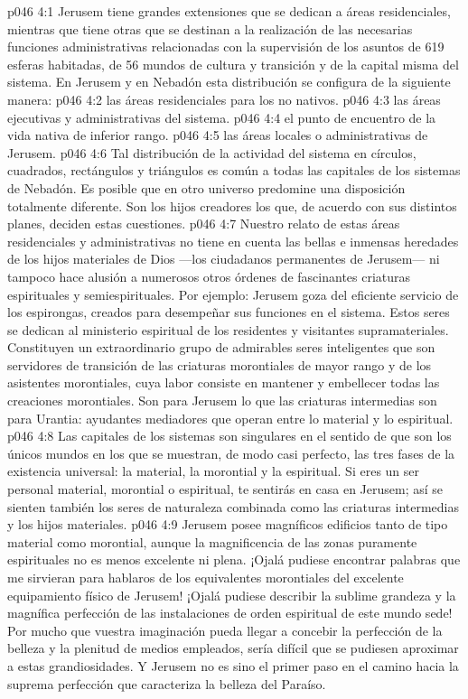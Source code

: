 \vs p046 4:1 Jerusem tiene grandes extensiones que se dedican a áreas residenciales, mientras que tiene otras que se destinan a la realización de las necesarias funciones administrativas relacionadas con la supervisión de los asuntos de 619 esferas habitadas, de 56 mundos de cultura y transición y de la capital misma del sistema. En Jerusem y en Nebadón esta distribución se configura de la siguiente manera:
\vs p046 4:2  las áreas residenciales para los no nativos.
\vs p046 4:3  las áreas ejecutivas y administrativas del sistema.
\vs p046 4:4  el punto de encuentro de la vida nativa de inferior rango.
\vs p046 4:5  las áreas locales o administrativas de Jerusem.
\vs p046 4:6 \pc Tal distribución de la actividad del sistema en círculos, cuadrados, rectángulos y triángulos es común a todas las capitales de los sistemas de Nebadón. Es posible que en otro universo predomine una disposición totalmente diferente. Son los hijos creadores los que, de acuerdo con sus distintos planes, deciden estas cuestiones.
\vs p046 4:7 \pc Nuestro relato de estas áreas residenciales y administrativas no tiene en cuenta las bellas e inmensas heredades de los hijos materiales de Dios ---los ciudadanos permanentes de Jerusem--- ni tampoco hace alusión a numerosos otros órdenes de fascinantes criaturas espirituales y semiespirituales. Por ejemplo: Jerusem goza del eficiente servicio de los espirongas, creados para desempeñar sus funciones en el sistema. Estos seres se dedican al ministerio espiritual de los residentes y visitantes supramateriales. Constituyen un extraordinario grupo de admirables seres inteligentes que son servidores de transición de las criaturas morontiales de mayor rango y de los asistentes morontiales, cuya labor consiste en mantener y embellecer todas las creaciones morontiales. Son para Jerusem lo que las criaturas intermedias son para Urantia: ayudantes mediadores que operan entre lo material y lo espiritual.
\vs p046 4:8 Las capitales de los sistemas son singulares en el sentido de que son los únicos mundos en los que se muestran, de modo casi perfecto, las tres fases de la existencia universal: la material, la morontial y la espiritual. Si eres un ser personal material, morontial o espiritual, te sentirás en casa en Jerusem; así se sienten también los seres de naturaleza combinada como las criaturas intermedias y los hijos materiales.
\vs p046 4:9 Jerusem posee magníficos edificios tanto de tipo material como morontial, aunque la magnificencia de las zonas puramente espirituales no es menos excelente ni plena. ¡Ojalá pudiese encontrar palabras que me sirvieran para hablaros de los equivalentes morontiales del excelente equipamiento físico de Jerusem! ¡Ojalá pudiese describir la sublime grandeza y la magnífica perfección de las instalaciones de orden espiritual de este mundo sede! Por mucho que vuestra imaginación pueda llegar a concebir la perfección de la belleza y la plenitud de medios empleados, sería difícil que se pudiesen aproximar a estas grandiosidades. Y Jerusem no es sino el primer paso en el camino hacia la suprema perfección que caracteriza la belleza del Paraíso.
